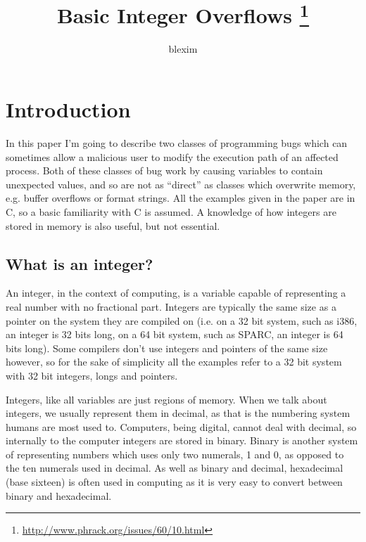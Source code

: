 \documentclass{iacrtrans}
\author{ blexim }
\institute{ \email{blexim@hush.com} }
\title{Basic Integer Overflows%
\thanks{\url{http://www.phrack.org/issues/60/10.html}}}
\begin{document}
\maketitle

\tableofcontents





\section{Introduction}

In this paper I'm going to describe two classes of programming bugs which
can sometimes allow a malicious user to modify the execution path of an
affected process.  Both of these classes of bug work by causing variables
to contain unexpected values, and so are not as ``direct'' as classes which
overwrite memory, e.g. buffer overflows or format strings.  All the
examples given in the paper are in C, so a basic familiarity with C is
assumed.  A knowledge of how integers are stored in memory is also useful,
but not essential.


\subsection{What is an integer?}

An integer, in the context of computing, is a variable capable of
representing a real number with no fractional part.  Integers are typically
the same size as a pointer on the system they are compiled on (i.e. on a 32
bit system, such as i386, an integer is 32 bits long, on a 64 bit system,
such as SPARC, an integer is 64 bits long).  Some compilers don't use
integers and pointers of the same size however, so for the sake of
simplicity all the examples refer to a 32 bit system with 32 bit integers,
longs and pointers.

Integers, like all variables are just regions of memory.  When we talk
about integers, we usually represent them in decimal, as that is the
numbering system humans are most used to.  Computers, being digital, cannot
deal with decimal, so internally to the computer integers are stored in
binary.  Binary is another system of representing numbers which uses only
two numerals, 1 and 0, as opposed to the ten numerals used in decimal.  As
well as binary and decimal, hexadecimal (base sixteen) is often used in
computing as it is very easy to convert between binary and hexadecimal.
\end{document}
